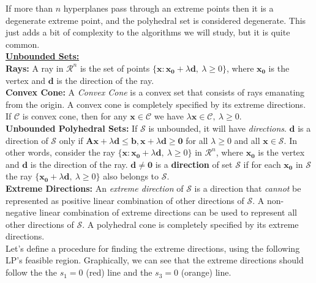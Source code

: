 If more than $n$ hyperplanes pass through an extreme points then it is a degenerate extreme point, and the polyhedral set is considered degenerate. This just adds a bit of complexity to the algorithms we will study, but it is quite common. \\
  

\underline {\bf Unbounded Sets:} \\ 

{\bf Rays:} A ray in $\mathcal{R}^n$ is the set of points $\{\mathbf{x}: \mathbf{x_0} + \lambda\mathbf{d},~ \lambda \ge 0\}$, where $\mathbf{x_0}$ is the vertex and $\mathbf{d}$ is the direction of the ray.\\


{\bf Convex Cone:} A {\it Convex Cone} is a convex set that consists of rays emanating from the origin.  A convex cone is completely specified by its extreme directions.  If $\mathcal{C}$ is convex cone, then for any $\mathbf{x} \in \mathcal{C}$ we have $\lambda \mathbf{x} \in \mathcal{C},~ \lambda \ge 0$. \\

{\bf Unbounded Polyhedral Sets:} If $\mathcal{S}$ is unbounded, it will have {\it directions}. $\mathbf{d}$ is a direction of $\mathcal{S}$ only if $\mathbf{A} \mathbf{x} + \lambda\mathbf{d} \le \mathbf{b}, \mathbf{x} + \lambda\mathbf{d} \ge \mathbf{0}$ for all $\lambda \ge 0$ and all $\mathbf{x} \in \mathcal{S}$.  In other words, consider the ray $\{\mathbf{x}: \mathbf{x_0} + \lambda\mathbf{d},~ \lambda \ge 0\}$ in $\mathcal{R}^n$, where $\mathbf{x_0}$ is the vertex and $\mathbf{d}$ is the direction of the ray. $\mathbf{d} \ne \mathbf{0}$ is a {\bf direction} of set $\mathcal{S}$ if for each $\mathbf{x_0}$ in $\mathcal{S}$ the ray $\{\mathbf{x_0} + \lambda\mathbf{d},~ \lambda \ge 0\}$ also belongs to $\mathcal{S}$. \\

{\bf Extreme Directions:} An {\it extreme direction} of $\mathcal{S}$ is a direction that {\it cannot} be represented as positive linear combination of other directions of $\mathcal{S}$. A non-negative linear combination of extreme directions can be used to represent all other directions of $\mathcal{S}$. A polyhedral cone is completely specified by its extreme directions. \\

Let's define a procedure for finding the extreme directions, using the following LP's feasible region.  Graphically, we can see that the extreme directions should follow the the $s_1=0$ (red) line and the $s_3 = 0$ (orange) line. 
 
